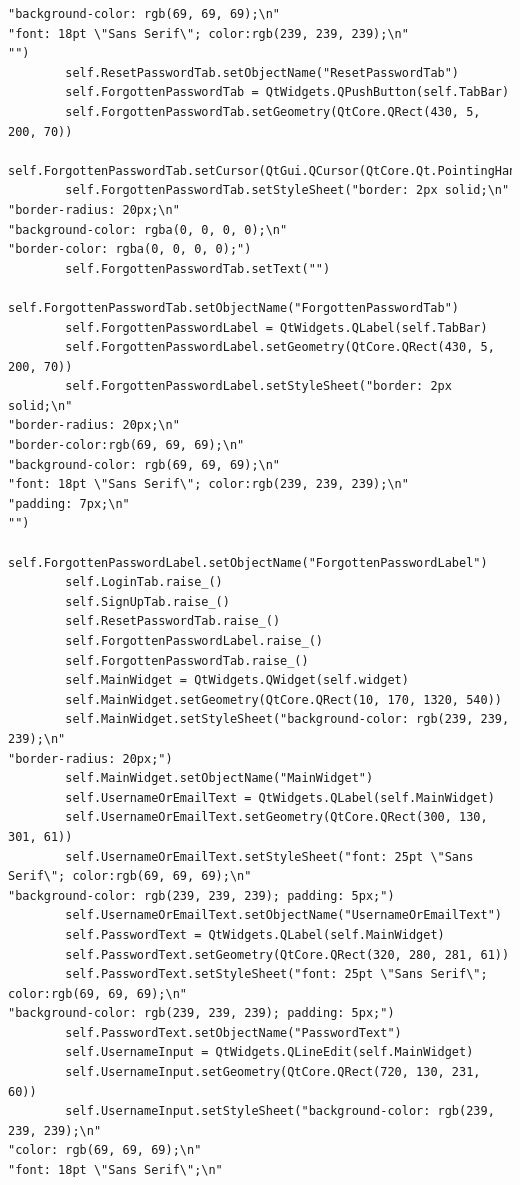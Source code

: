 \documentclass{article}
\begin{document}
\begin{lstlisting}
"background-color: rgb(69, 69, 69);\n"
"font: 18pt \"Sans Serif\"; color:rgb(239, 239, 239);\n"
"")
        self.ResetPasswordTab.setObjectName("ResetPasswordTab")
        self.ForgottenPasswordTab = QtWidgets.QPushButton(self.TabBar)
        self.ForgottenPasswordTab.setGeometry(QtCore.QRect(430, 5, 200, 70))
        self.ForgottenPasswordTab.setCursor(QtGui.QCursor(QtCore.Qt.PointingHandCursor))
        self.ForgottenPasswordTab.setStyleSheet("border: 2px solid;\n"
"border-radius: 20px;\n"
"background-color: rgba(0, 0, 0, 0);\n"
"border-color: rgba(0, 0, 0, 0);")
        self.ForgottenPasswordTab.setText("")
        self.ForgottenPasswordTab.setObjectName("ForgottenPasswordTab")
        self.ForgottenPasswordLabel = QtWidgets.QLabel(self.TabBar)
        self.ForgottenPasswordLabel.setGeometry(QtCore.QRect(430, 5, 200, 70))
        self.ForgottenPasswordLabel.setStyleSheet("border: 2px solid;\n"
"border-radius: 20px;\n"
"border-color:rgb(69, 69, 69);\n"
"background-color: rgb(69, 69, 69);\n"
"font: 18pt \"Sans Serif\"; color:rgb(239, 239, 239);\n"
"padding: 7px;\n"
"")
        self.ForgottenPasswordLabel.setObjectName("ForgottenPasswordLabel")
        self.LoginTab.raise_()
        self.SignUpTab.raise_()
        self.ResetPasswordTab.raise_()
        self.ForgottenPasswordLabel.raise_()
        self.ForgottenPasswordTab.raise_()
        self.MainWidget = QtWidgets.QWidget(self.widget)
        self.MainWidget.setGeometry(QtCore.QRect(10, 170, 1320, 540))
        self.MainWidget.setStyleSheet("background-color: rgb(239, 239, 239);\n"
"border-radius: 20px;")
        self.MainWidget.setObjectName("MainWidget")
        self.UsernameOrEmailText = QtWidgets.QLabel(self.MainWidget)
        self.UsernameOrEmailText.setGeometry(QtCore.QRect(300, 130, 301, 61))
        self.UsernameOrEmailText.setStyleSheet("font: 25pt \"Sans Serif\"; color:rgb(69, 69, 69);\n"
"background-color: rgb(239, 239, 239); padding: 5px;")
        self.UsernameOrEmailText.setObjectName("UsernameOrEmailText")
        self.PasswordText = QtWidgets.QLabel(self.MainWidget)
        self.PasswordText.setGeometry(QtCore.QRect(320, 280, 281, 61))
        self.PasswordText.setStyleSheet("font: 25pt \"Sans Serif\"; color:rgb(69, 69, 69);\n"
"background-color: rgb(239, 239, 239); padding: 5px;")
        self.PasswordText.setObjectName("PasswordText")
        self.UsernameInput = QtWidgets.QLineEdit(self.MainWidget)
        self.UsernameInput.setGeometry(QtCore.QRect(720, 130, 231, 60))
        self.UsernameInput.setStyleSheet("background-color: rgb(239, 239, 239);\n"
"color: rgb(69, 69, 69);\n"
"font: 18pt \"Sans Serif\";\n"

\end{lstlisting}
\end{document}
